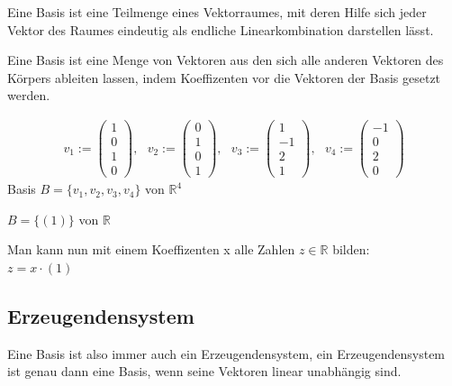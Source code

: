 \documentclass{scrartcl}
\begin{document}
\begin{Def}
Eine Basis ist eine Teilmenge eines Vektorraumes, mit deren Hilfe sich jeder Vektor des Raumes eindeutig als endliche Linearkombination darstellen lässt. 


Eine Basis ist eine Menge von Vektoren aus den sich alle anderen Vektoren des Körpers ableiten lassen, indem Koeffizenten vor die Vektoren der Basis gesetzt werden.
\end{Def}
\begin{Beispiel}
\begin{align*}
v_1 := \begin{pmatrix} 1 \\ 0 \\ 1\\ 0 \end{pmatrix}, ~~~ v_2:= \begin{pmatrix} 0 \\ 1 \\ 0\\ 1 \end{pmatrix}, ~~~ v_3:= \begin{pmatrix} 1 \\ -1 \\ 2\\ 1 \end{pmatrix}, ~~~ v_4:= \begin{pmatrix} -1 \\ 0 \\ 2\\ 0 \end{pmatrix}
\end{align*}
Basis $B = \{v_1, v_2, v_3, v_4\}$ von $\mathbb{R}^4$
\end{Beispiel}

\begin{Beispiel}
$B = \{(1)\}$ von $\mathbb{R}$


Man kann nun mit einem Koeffizenten x alle Zahlen $z \in \mathbb{R}$ bilden:\\
$z = x \cdot (1)$
\end{Beispiel}

\subsection{Erzeugendensystem}
\label{Erzeugendensystem}

Eine Basis ist also immer auch ein Erzeugendensystem, ein Erzeugendensystem ist genau dann eine Basis, wenn seine Vektoren linear unabhängig sind.
\end{document}
